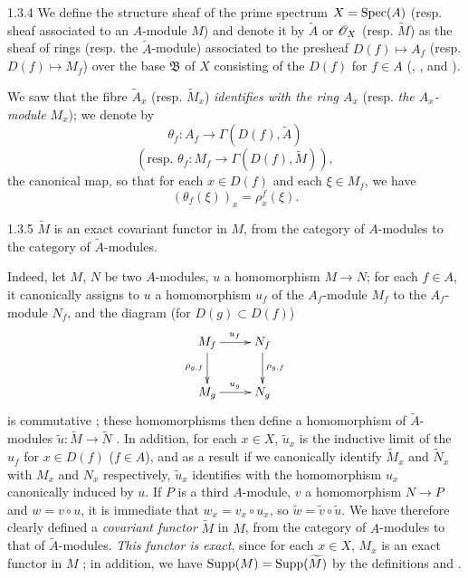 \documentclass[10pt,oneside]{book}
\begin{document}
\begin{envs}[Definition]{1.3.4}
\label{defn-1.1.3.4}
We define the structure sheaf of the prime spectrum $X={\mathop{\mathrm{Spec}}\nolimits}(A)$ (resp. sheaf associated to
an $A$-module $M$) and denote it by $\widetilde{A}$ or $\mathscr{O}_X$ (resp. $\widetilde{M}$) as the
sheaf of rings (resp. the $\widetilde{A}$-module) associated to the presheaf
$D(f)\mapsto A_f$ (resp. $D(f)\mapsto M_f$) over the base $\mathfrak{B}$ of $X$ consisting
of the $D(f)$ for $f\in A$ (, , and ).
\end{envs}

We saw  that the fibre $\widetilde{A}_x$ (resp. $\widetilde{M}_x$)
\emph{identifies with the ring $A_x$} (resp. \emph{the $A_x$-module $M_x$}); we denote by
\[
  \theta_f:A_f\longrightarrow\Gamma(D(f),\widetilde{A})
\]
\[
  (\text{resp. }\theta_f:M_f\longrightarrow\Gamma(D(f),\widetilde{M})),
\]
the canonical map, so that for each $x\in D(f)$ and each $\xi\in M_f$, we have
\[
  (\theta_f(\xi))_x=\rho_x^f(\xi).
  \tag{1.3.4.1}
\]

\begin{envs}[Proposition]{1.3.5}
\label{prop-1.1.3.5}
$\widetilde{M}$ is an exact covariant functor in $M$, from the category of $A$-modules to the
category of $\widetilde{A}$-modules.
\end{envs}

Indeed, let $M$, $N$ be two $A$-modules, $u$ a homomorphism $M\to N$; for each $f\in A$,
it canonically assigns to $u$ a homomorphism $u_f$ of the $A_f$-module $M_f$ to the
$A_f$-module $N_f$, and the diagram (for $D(g)\subset D(f)$)
\[
  \xymatrix{
    M_f\ar[r]^{u_f}\ar[d]_{\rho_{g,f}} & N_f\ar[d]^{\rho_{g,f}}\\
    M_g\ar[r]^{u_g} & N_g
  }
\]
is commutative ; these homomorphisms then define a homomorphism of
$\widetilde{A}$-modules $\widetilde{u}:\widetilde{M}\to\widetilde{N}$ . In
addition, for each $x\in X$, $\widetilde{u}_x$ is the inductive limit of the $u_f$ for
$x\in D(f)$ ($f\in A$), and as a result  if we canonically identify
$\widetilde{M}_x$ and $\widetilde{N}_x$ with $M_x$ and $N_x$ respectively, $\widetilde{u}_x$
identifies with the homomorphism $u_x$ canonically induced by $u$. If $P$ is a third
$A$-module, $v$ a homomorphism $N\to P$ and $w=v\circ u$, it is immediate that
$w_x=v_x\circ u_x$, so $\widetilde{w}=\widetilde{v}\circ\widetilde{u}$. We have therefore
clearly defined a \emph{covariant functor} $\widetilde{M}$ in $M$, from the category of
$A$-modules to that of $\widetilde{A}$-modules. \emph{This functor is exact}, since for each
$x\in X$, $M_x$ is an exact functor in $M$ ; in addition, we have
${\mathop{\mathrm{Supp}}\nolimits}(M)={\mathop{\mathrm{Supp}}\nolimits}(\widetilde{M})$ by the definitions  and .
\end{document}
